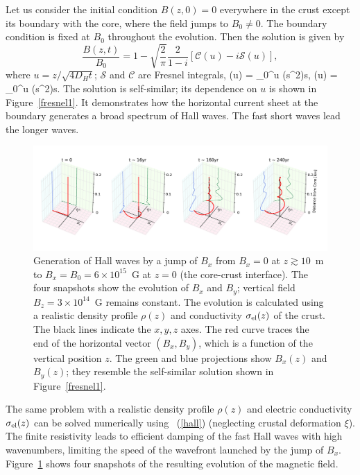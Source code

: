 Let us consider the initial condition $B(z,0)=0$ everywhere in the crust except
its boundary with the core, where the field jumps to $B_0\neq 0$. The boundary 
condition is fixed at $B_0$ throughout the evolution. Then the solution is given by
\begin{equation}\label{fre1}
  \frac{B(z,t)}{B_0} = 1-\sqrt{\frac{2}{\pi}}\frac{2}{1-i}\left[\mathcal{C}(u)-i\mathcal{S}(u)\right],
\end{equation}
where $u = z/\sqrt{4D_H t}$; $\mathcal{S}$ and $\mathcal{C}$ are Fresnel integrals,
\beq
	(u) = \int_0^u \sin(s^2)\:\md s,  \quad
	(u) = \int_0^u \cos(s^2)\:\md s.
\eeq
The solution is self-similar; its dependence on $u$ is shown in Figure~\ref{fresnel1}.
It demonstrates how the horizontal current sheet at the boundary generates a broad 
spectrum of Hall waves. The fast short waves lead the longer waves.

\begin{figure}[h]
\centering
\includegraphics[width=1.0\textwidth]{pics/chap2/hall.pdf} 
\caption[Generation of Hall waves in the magnetar crust]{
Generation of Hall waves by a jump of $B_x$ from $B_x=0$ at $z\gtrsim 10$~m to 
$B_x=B_0=6\times 10^{15}$~G at $z=0$ (the core-crust interface). The four snapshots show 
the evolution of $B_x$ and $B_y$; vertical field $B_z=3\times 10^{14}$~G remains constant. 
The evolution is calculated using a realistic density profile $\rho(z)$ and conductivity 
$\sigma_{\rm el}(z)$ of the crust. The black lines indicate the $x,y,z$ axes.  The red curve traces 
the end of the horizontal vector $(B_x,B_y)$, which is a function of the vertical position $z$.
The green and blue projections show $B_x(z)$ and $B_y(z)$; they resemble the 
self-similar solution shown in Figure~\ref{fresnel1}.
}
\label{cartoon}
\end{figure}


The same problem with a realistic density profile $\rho(z)$ and electric conductivity 
$\sigma_{\rm el}(z)$ can be solved numerically using \Eq~(\ref{hall}) (neglecting crustal 
deformation $\xi$). The finite resistivity leads to efficient damping of the fast Hall waves with 
high wavenumbers, limiting the speed of the wavefront launched by the jump of $B_x$.
Figure~\ref{cartoon} 
shows four snapshots of the resulting evolution of the magnetic field.

